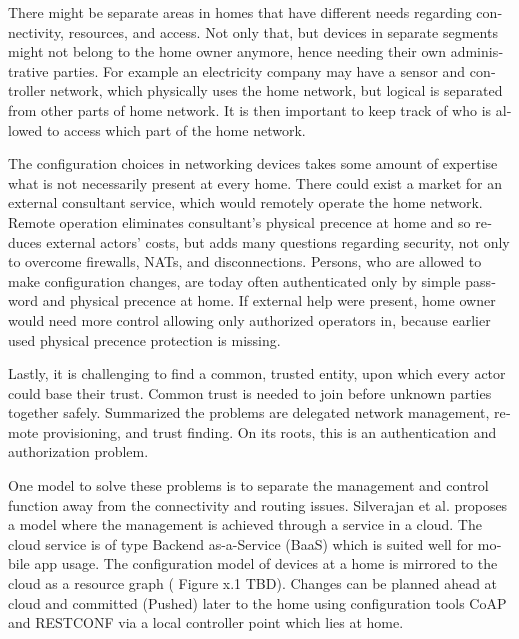 \documentclass[12pt,a4paper,english]{tutthesis}
\begin{document}
\begin{otherlanguage}{english}
There might be separate areas in homes that have different needs regarding
connectivity, resources, and access. Not only that, but devices in
separate segments might not belong to the home owner anymore, hence needing
their own administrative parties. For example an electricity company may
have a sensor and controller network, which physically uses the home network, but
logical is separated from other parts of home network. It is then
important to keep track of who is allowed to access which part of the
home network. 


The configuration choices in networking devices takes some
amount of expertise what is not necessarily present at every
home. There could exist a market for an external consultant service, which would
remotely operate the home network.
Remote operation eliminates consultant's 
physical precence at home and so reduces external actors' costs, but adds many questions
regarding security, not only to overcome firewalls, NATs, and disconnections.
Persons, who are allowed to make configuration changes, are today
often authenticated only by simple password and physical precence at home.
If external help were present, home owner would need more 
control allowing only authorized operators in, because earlier used
physical precence protection is missing.

Lastly, it is challenging to find a common, 
trusted entity, upon which every actor could base their trust.
Common trust is needed to join before unknown parties together
safely. 
Summarized the problems are delegated network management, remote
provisioning, and trust finding. On its roots, this is an authentication
and authorization problem.










One model to solve these problems is to separate the management and
control function away from the connectivity and routing
issues. Silverajan et al.\cite{silverajan2015collaborative} proposes
a model where the management is achieved through a service in a cloud.
The cloud service is of type Backend as-a-Service (BaaS) which is suited
well for mobile app usage. The
configuration model of devices at a home is mirrored to the cloud as a
resource graph ( Figure x.1 TBD). Changes can be planned ahead at cloud
and committed (Pushed) later to the home  using configuration tools
CoAP and RESTCONF via a local controller point which lies at home.


\end{otherlanguage}
\end{document}
